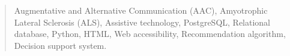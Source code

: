 \documentclass[a4paper,12pt,twoside]{memoir}
\begin{document}
\renewcommand*\abstractname{Keywords}
\begin{abstract}
Augmentative and Alternative Communication (AAC), Amyotrophic Lateral Sclerosis (ALS), Assistive technology, PostgreSQL, Relational database, Python, HTML, Web accessibility, Recommendation algorithm, Decision support system.
\end{abstract}

\clearpage

\tableofcontents

\clearpage

\listoffigures

\clearpage

\listoftables
\clearpage


\mainmatter









\nocite{*} 


\end{document}
